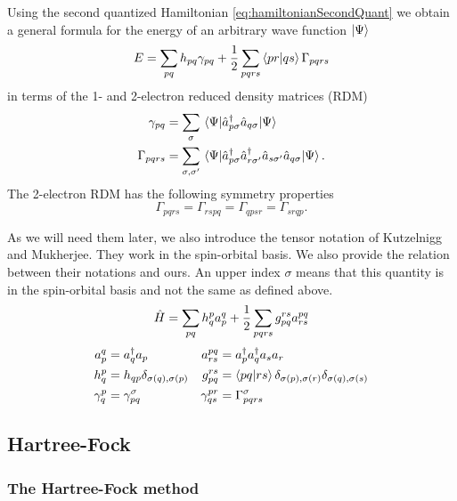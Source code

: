 \documentclass[11pt,a4paper]{article}
\newcommand{\hH}{\Hat{H}} %
\newcommand{\cre}[1]{a_{#1}^\dagger} %
\newcommand{\ani}[1]{a_{#1}} %
\begin{document}
Using the second quantized Hamiltonian \ref{eq:hamiltonianSecondQuant} we obtain a general formula for the energy of an arbitrary wave function $\ket{\Psi}$
\begin{equation}
  \label{eq:energyDensityMat}
  E = \sum_{pq}h_{pq} \gamma_{pq} + \frac{1}{2}\sum_{pqrs} \braket{pr}{qs} \Gamma_{pqrs}
\end{equation}
in terms of the 1- and 2-electron reduced density matrices (RDM)
\begin{align}
  \label{eq:densityMat}
  \gamma_{pq}&=\sum_\sigma\mel{\Psi}{\hat{a}_{p\sigma}^\dagger \hat{a}_{q\sigma}}{\Psi}\\
  \Gamma_{pqrs}&=\sum_{\sigma,\sigma'}\mel{\Psi}{\hat{a}_{p\sigma}^\dagger\hat{a}_{r\sigma'}^\dagger\hat{a}_{s\sigma'}\hat{a}_{q\sigma}}{\Psi}.
\end{align}
The 2-electron RDM has the following symmetry properties
\begin{equation}
  \label{eq:2RDMsymmetry}
  \Gamma_{pqrs}=\Gamma_{rspq}=\Gamma_{qpsr}=\Gamma_{srqp}.
\end{equation}

As we will need them later, we also introduce the tensor notation of Kutzelnigg and Mukherjee. They work in the spin-orbital basis. We also provide the relation between their notations and ours. An upper index $\sigma$ means that this quantity is in the spin-orbital basis and not the same as defined above.
\begin{equation*}
 \hH=\sum_{pq} h_q^pa_p^q + \frac{1}{2}\sum_{pqrs}g_{pq}^{rs}a_{rs}^{pq}
\end{equation*}
\begin{align}
  a_p^q&= \cre{q}\ani{p} & a_{rs}^{pq}&= \cre{p}\cre{q}\ani{s}\ani{r} \\
  h_q^p&=h_{qp}\delta_{\sigma(q),\sigma(p)} &  g_{pq}^{rs}&=\braket{pq}{rs}\delta_{\sigma(p),\sigma(r)} \delta_{\sigma(q),\sigma(s)} \\
  \gamma_q^p&=\gamma_{pq}^\sigma & \gamma_{qs}^{pr}&=\Gamma_{pqrs}^\sigma
\end{align}

\subsection{Hartree-Fock}
\label{sec:HF}

\subsubsection{The Hartree-Fock method}
\label{sec:introHF}
\end{document}
